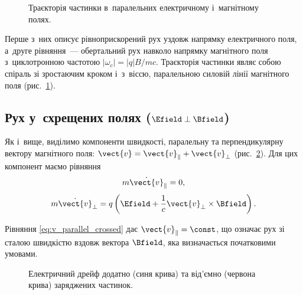 \begin{figure}
	\centering
	\caption{Траєкторія частинки в~паралельних електричному і~магнітному полях.}
	\label{tikz:helix}
\end{figure}

Перше з~них описує рівноприскорений рух уздовж напрямку електричного поля, а~друге рівняння~--- обертальний рух навколо напрямку магнітного поля з~циклотронною частотою $|\omega_c| = |q|B/mc$. Траєкторія частинки являє собою спіраль зі зростаючим кроком і~з~віссю, паралельною силовій лінії магнітного поля (рис.~\ref{tikz:helix}).


\subsection*{Рух у~схрещених полях ($\Efield \perp \Bfield$)}


Як і~вище, виділимо компоненти швидкості, паралельну та перпендикулярну вектору магнітного поля: $\vect{v} = \vect{v}_{\parallel} + \vect{v}_{\perp}$ (рис.~\ref{tikz:drift}). Для цих компонент маємо рівняння
\begin{equation}\label{eq:v_parallel_crossed}
	m\dot{\vect{v}}_{\parallel} = 0,
\end{equation}
\begin{equation}\label{eq:v_perp_crossed}
	m\dot{\vect{v}}_{\perp} = q\left(\Efield + \frac{1}{c}\vect{v}_{\perp} \times \Bfield\right).
\end{equation}

Рівняння \eqref{eq:v_parallel_crossed} дає $\vect{v}_{\parallel} = \const$, що означає рух зі сталою швидкістю вздовж вектора $\Bfield$, яка визначається початковими умовами.

\begin{figure}[h!]
	\centering
	\caption{Електричний дрейф додатно (синя крива) та від'ємно (червона крива) заряджених частинок.}
	\label{tikz:drift}
\end{figure}

